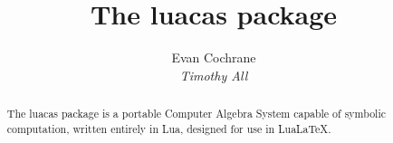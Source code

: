 \documentclass{article}
\begin{document}
\title{The {\ttfamily luacas} package}
\author{Evan Cochrane \\ {\itshape Timothy All}}
\date{} 

\maketitle 

\begin{abstract}
    The {\ttfamily luacas} package is a portable Computer Algebra System capable of symbolic computation, written entirely in Lua, designed for use in Lua\LaTeX{}.
\end{abstract}

\tableofcontents

















 

 













\appendix



\newpage

\printindex
\end{document}

